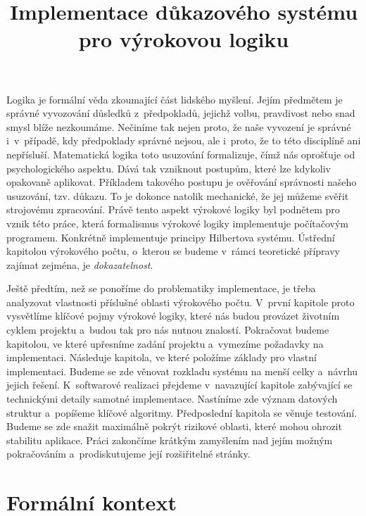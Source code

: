 \documentclass[thesis=B,czech,hidelinks]{thesis}[2012/06/26]
\title{Implementace důkazového systému pro výrokovou logiku}
\begin{document}
\theoremstyle{definition}
\newtheorem{exm}{Příklad}
\newtheorem{dfn}{Definice}


%
%
%

\begin{introduction}
Logika je formální věda zkoumající část lidského myšlení. Jejím předmětem je správné vyvozování důsledků z~předpokladů, jejichž volbu, pravdivost nebo snad smysl blíže nezkoumáme. Nečiníme tak nejen proto, že naše vyvození je správné i~v~případě, kdy předpoklady správné nejsou, ale i~proto, že to této disciplíně ani nepřísluší. Matematická logika toto usuzování formalizuje, čímž nás oprošťuje od psychologického aspektu. Dává tak vzniknout postupům, které lze kdykoliv opakovaně aplikovat. Příkladem takového postupu je ověřování správnosti našeho usuzování, tzv. důkazu. To je dokonce natolik mechanické, že jej můžeme svěřit strojovému zpracování\cite{sochor}. Právě tento aspekt výrokové logiky byl podnětem pro vznik této práce, která formalismus výrokové logiky implementuje počítačovým programem. Konkrétně implementuje principy Hilbertova systému. Ústřední kapitolou výrokového počtu, o~kterou se budeme v~rámci teoretické přípravy zajímat zejména, je \emph{dokazatelnost}.

Ještě předtím, než se ponoříme do problematiky implementace, je třeba analyzovat vlastnosti příslušné oblasti výrokového počtu. V~první kapitole proto vysvětlíme klíčové pojmy výrokové logiky, které nás budou provázet životním cyklem projektu a~budou tak pro nás nutnou znalostí. Pokračovat budeme kapitolou, ve které upřesníme zadání projektu a~vymezíme požadavky na implementaci. Následuje kapitola, ve které položíme základy pro vlastní implementaci. Budeme se zde věnovat rozkladu systému na menší celky a~návrhu jejich řešení. K~softwarové realizaci přejdeme v~navazující kapitole zabývající se technickými detaily samotné implementace. Nastíníme zde význam datových struktur a~popíšeme klíčové algoritmy. Předposlední kapitola se věnuje testování. Budeme se zde snažit maximálně pokrýt rizikové oblasti, které mohou ohrozit stabilitu aplikace. Práci zakončíme krátkým zamyšlením nad jejím možným pokračováním a~prodiskutujeme její rozšiřitelné stránky.
\end{introduction}

%
%
%

\chapter{Formální kontext}
\end{document}
